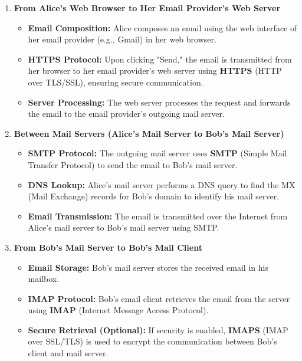 \documentclass{cshwk}
\begin{document}
\begin{enumerate}
    \item \textbf{From Alice's Web Browser to Her Email Provider's Web Server}
    \begin{itemize}
        \item \textbf{Email Composition:} Alice composes an email using the web interface of her email provider (e.g., Gmail) in her web browser.
        \item \textbf{HTTPS Protocol:} Upon clicking "Send," the email is transmitted from her browser to her email provider's web server using \textbf{HTTPS} (HTTP over TLS/SSL), ensuring secure communication.
        \item \textbf{Server Processing:} The web server processes the request and forwards the email to the email provider's outgoing mail server.
    \end{itemize}
    
    \item \textbf{Between Mail Servers (Alice's Mail Server to Bob's Mail Server)}
    \begin{itemize}
        \item \textbf{SMTP Protocol:} The outgoing mail server uses \textbf{SMTP} (Simple Mail Transfer Protocol) to send the email to Bob's mail server.
        \item \textbf{DNS Lookup:} Alice's mail server performs a DNS query to find the MX (Mail Exchange) records for Bob's domain to identify his mail server.
        \item \textbf{Email Transmission:} The email is transmitted over the Internet from Alice's mail server to Bob's mail server using SMTP.
    \end{itemize}
    
    \item \textbf{From Bob's Mail Server to Bob's Mail Client}
    \begin{itemize}
        \item \textbf{Email Storage:} Bob's mail server stores the received email in his mailbox.
        \item \textbf{IMAP Protocol:} Bob's email client retrieves the email from the server using \textbf{IMAP} (Internet Message Access Protocol).
        \item \textbf{Secure Retrieval (Optional):} If security is enabled, \textbf{IMAPS} (IMAP over SSL/TLS) is used to encrypt the communication between Bob's client and mail server.
    \end{itemize}
\end{enumerate}
\end{document}

